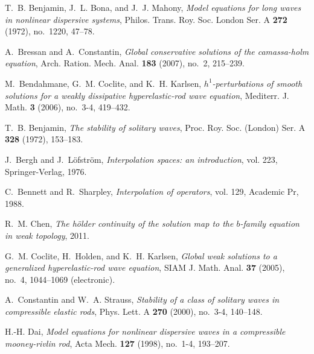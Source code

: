 \documentclass[12pt,reqno]{amsart}
\numberwithin{equation}{section}  %
\numberwithin{figure}{section}
\begin{document}
%
%
%
%
\providecommand{\bysame}{\leavevmode\hbox to3em{\hrulefill}\thinspace}
\providecommand{\MR}{\relax\ifhmode\unskip\space\fi MR }
\providecommand{\MRhref}[2]{%
  \href{http://www.ams.org/mathscinet-getitem?mr=#1}{#2}
}
\providecommand{\href}[2]{#2}
\begin{thebibliography}{HKM09}

T.~B. Benjamin, J.~L. Bona, and J.~J. Mahony, \emph{Model equations for long
  waves in nonlinear dispersive systems}, Philos. Trans. Roy. Soc. London Ser.
  A \textbf{272} (1972), no.~1220, 47--78.

A.~Bressan and A.~Constantin, \emph{Global conservative solutions of the
  camassa-holm equation}, Arch. Ration. Mech. Anal. \textbf{183} (2007), no.~2,
  215--239.

M.~Bendahmane, G.~M. Coclite, and K.~H. Karlsen, \emph{$h^1$-perturbations of
  smooth solutions for a weakly dissipative hyperelastic-rod wave equation},
  Mediterr. J. Math. \textbf{3} (2006), no.~3-4, 419--432.

T.~B. Benjamin, \emph{The stability of solitary waves}, Proc. Roy. Soc.
  (London) Ser. A \textbf{328} (1972), 153--183.

J.~Bergh and J.~L{\"o}fstr{\"o}m, \emph{Interpolation spaces: an introduction},
  vol. 223, Springer-Verlag, 1976.

C.~Bennett and R.~Sharpley, \emph{Interpolation of operators}, vol. 129,
  Academic Pr, 1988.

R.~M. Chen, \emph{The h{\"o}lder continuity of the solution map to the
  $b$-family equation in weak topology}, 2011.

G.~M. Coclite, H.~Holden, and K.~H. Karlsen, \emph{Global weak solutions to a
  generalized hyperelastic-rod wave equation}, SIAM J. Math. Anal. \textbf{37}
  (2005), no.~4, 1044--1069 (electronic).

A.~Constantin and W.~A. Strauss, \emph{Stability of a class of solitary waves
  in compressible elastic rods}, Phys. Lett. A \textbf{270} (2000), no.~3-4,
  140--148.

H.-H. Dai, \emph{Model equations for nonlinear dispersive waves in a
  compressible mooney-rivlin rod}, Acta Mech. \textbf{127} (1998), no.~1-4,
  193--207.


\end{thebibliography}
\end{document}
